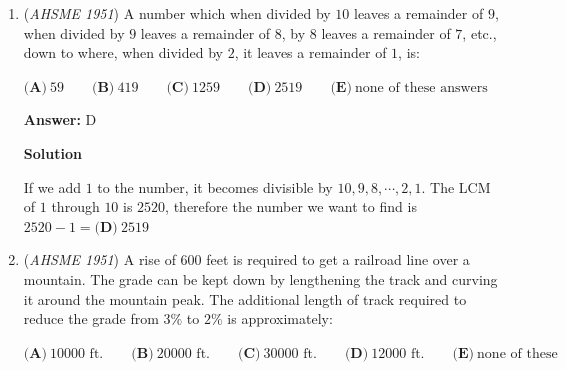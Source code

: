 \begin{enumerate}
 $\textbf{(A)}\ \text{Every point of the locus satisfies the conditions and every point not on the locus does not satisfy the conditions.}$
$\textbf{(B)}\ \text{Every point not satisfying the conditions is not on the locus and every point on the locus does satisfy the conditions.}$
$\textbf{(C)}\ \text{Every point satisfying the conditions is on the locus and every point on the locus satisfies the conditions.}$
$\textbf{(D)}\ \text{Every point not on the locus does not satisfy the conditions and every point not satisfying}\\ \text{the conditions is not on the locus.}$
$\textbf{(E)}\ \text{Every point satisfying the conditions is on the locus and every point not satisfying the conditions is not on the locus.}$

 \textbf{Answer: }B



\textbf{Solution}

Statement $\boxed{\textbf{(B)}}$ is wrong because it does not imply that all points that satisfy the conditions are on the locus.

 


	\item (\textit{AHSME 1951}) A number which when divided by $10$ leaves a remainder of $9$, when divided by $9$ leaves a remainder of $8$, by $8$ leaves a remainder of $7$, etc., down to where, when divided by $2$, it leaves a remainder of $1$, is: 


 $\textbf{(A)}\ 59\qquad\textbf{(B)}\ 419\qquad\textbf{(C)}\ 1259\qquad\textbf{(D)}\ 2519\qquad\textbf{(E)}\ \text{none of these answers}$

 \textbf{Answer: }D



\textbf{Solution}

If we add $1$ to the number, it becomes divisible by $10, 9, 8, \cdots, 2, 1$. The LCM of $1$ through $10$ is $2520$, therefore the number we want to find is $2520-1=\boxed{\textbf{(D)}\ 2519}$



	\item (\textit{AHSME 1951}) A rise of $600$ feet is required to get a railroad line over a mountain. The grade can be kept down by lengthening the track and curving it around the mountain peak. The additional length of track required to reduce the grade from $3\%$ to $2\%$ is approximately: 


 $\textbf{(A)}\ 10000\text{ ft.}\qquad\textbf{(B)}\ 20000\text{ ft.}\qquad\textbf{(C)}\ 30000\text{ ft.}\qquad\textbf{(D)}\ 12000\text{ ft.}\qquad\textbf{(E)}\ \text{none of these}$


\end{enumerate}
